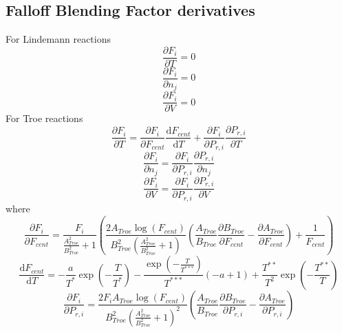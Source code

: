 \documentclass[a4paper,10pt]{article}
\begin{document}
\subsection{Falloff Blending Factor derivatives}

 For Lindemann reactions
\begin{dmath} \frac{\partial F_{i} }{\partial T } = 0\end{dmath} 
\begin{dmath} \frac{\partial F_{i} }{\partial {n_j} } = 0\end{dmath} 
\begin{dmath} \frac{\partial F_{i} }{\partial V } = 0\end{dmath} 
For Troe reactions
\begin{dmath} \frac{\partial F_{i} }{\partial T } = \frac{\partial F_{i} }{\partial F_{cent} } \frac{\text{d} F_{cent} }{\text{d} T } + \frac{\partial F_{i} }{\partial P_{r, i} } \frac{\partial P_{r, i} }{\partial T }\end{dmath} 
\begin{dmath} \frac{\partial F_{i} }{\partial {n_j} } = \frac{\partial F_{i} }{\partial P_{r, i} } \frac{\partial P_{r, i} }{\partial {n_j} }\end{dmath} 
\begin{dmath} \frac{\partial F_{i} }{\partial V } = \frac{\partial F_{i} }{\partial P_{r, i} } \frac{\partial P_{r, i} }{\partial V }\end{dmath} 
where
\begin{dmath} \frac{\partial F_{i} }{\partial F_{cent} } = \frac{F_{i}}{\frac{A_{Troe}^{2}}{B_{Troe}^{2}} + 1} \left(\frac{2 A_{Troe} \log{\left (F_{cent} \right )}}{B_{Troe}^{2} \left(\frac{A_{Troe}^{2}}{B_{Troe}^{2}} + 1\right)} \left(\frac{A_{Troe}}{B_{Troe}} \frac{\partial B_{Troe} }{\partial F_{cent} } - \frac{\partial A_{Troe} }{\partial F_{cent} }\right) + \frac{1}{F_{cent}}\right)\end{dmath} 
\begin{dmath} \frac{\text{d} F_{cent} }{\text{d} T } = - \frac{a}{T^{*}} \operatorname{exp}\left({- \frac{T}{T^{*}}}\right) - \frac{\operatorname{exp}\left({- \frac{T}{T^{***}}}\right)}{T^{***}} \left(- a + 1\right) + \frac{T^{**}}{T^{2}} \operatorname{exp}\left({- \frac{T^{**}}{T}}\right)\end{dmath} 
\begin{dmath} \frac{\partial F_{i} }{\partial P_{r, i} } = \frac{2 F_{i} A_{Troe} \log{\left (F_{cent} \right )}}{B_{Troe}^{2} \left(\frac{A_{Troe}^{2}}{B_{Troe}^{2}} + 1\right)^{2}} \left(\frac{A_{Troe}}{B_{Troe}} \frac{\partial B_{Troe} }{\partial P_{r, i} } - \frac{\partial A_{Troe} }{\partial P_{r, i} }\right)\end{dmath} 
\end{document}
